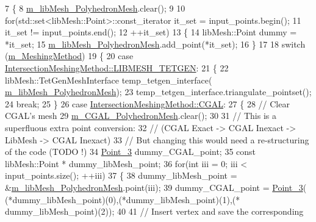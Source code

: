 \begin{DoxyCode}
7 \{
8     \hyperlink{classcarl_1_1_mesh___intersection_a4377fd67cf7c486ba4263fe11b99a3cf}{m\_libMesh\_PolyhedronMesh}.clear();
9 
10     \textcolor{keywordflow}{for}(std::set<libMesh::Point>::const\_iterator it\_set = input\_points.begin();
11             it\_set != input\_points.end();
12             ++it\_set)
13     \{
14         libMesh::Point dummy = *it\_set;
15         \hyperlink{classcarl_1_1_mesh___intersection_a4377fd67cf7c486ba4263fe11b99a3cf}{m\_libMesh\_PolyhedronMesh}.add\_point(*it\_set);
16     \}
17 
18     \textcolor{keywordflow}{switch} (\hyperlink{classcarl_1_1_mesh___intersection_aa42a12f25859de7ce08655a1ada87e50}{m\_MeshingMethod})
19     \{
20     \textcolor{keywordflow}{case} \hyperlink{namespacecarl_a4f72fd25137b97ac1ca1276ec549e5cfa0a91b3dbac7fab7e5efa6f804aab8f58}{IntersectionMeshingMethod::LIBMESH\_TETGEN}:
21     \{
22         libMesh::TetGenMeshInterface            temp\_tetgen\_interface(
      \hyperlink{classcarl_1_1_mesh___intersection_a4377fd67cf7c486ba4263fe11b99a3cf}{m\_libMesh\_PolyhedronMesh});
23         temp\_tetgen\_interface.triangulate\_pointset();
24         \textcolor{keywordflow}{break};
25     \}
26     \textcolor{keywordflow}{case} \hyperlink{namespacecarl_a4f72fd25137b97ac1ca1276ec549e5cfa509162a828acac7eaad1fc369696a3b1}{IntersectionMeshingMethod::CGAL}:
27     \{
28         \textcolor{comment}{// Clear CGAL's mesh}
29         \hyperlink{classcarl_1_1_mesh___intersection_a256506b058cda4c9b767d14277b9650c}{m\_CGAL\_PolyhedronMesh}.clear();
30 
31         \textcolor{comment}{// This is a superfluous extra point conversion:}
32         \textcolor{comment}{// (CGAL Exact -> CGAL Inexact -> LibMesh -> CGAL Inexact)}
33         \textcolor{comment}{// But changing this would need a re-structuring of the code (TODO !)}
34         \hyperlink{_c_g_a_l__typedefs_8h_a9dc49a828e77bbd58c1f5db13edde547}{Point\_3} dummy\_CGAL\_point;
35         \textcolor{keyword}{const} libMesh::Point * dummy\_libMesh\_point;
36         \textcolor{keywordflow}{for}(\textcolor{keywordtype}{int} iii = 0; iii < input\_points.size(); ++iii)
37         \{
38             dummy\_libMesh\_point = &\hyperlink{classcarl_1_1_mesh___intersection_a4377fd67cf7c486ba4263fe11b99a3cf}{m\_libMesh\_PolyhedronMesh}.point(iii);
39             dummy\_CGAL\_point = \hyperlink{_c_g_a_l__typedefs_8h_a9dc49a828e77bbd58c1f5db13edde547}{Point\_3}( (*dummy\_libMesh\_point)(0),(*dummy\_libMesh\_point)(1),(*
      dummy\_libMesh\_point)(2));
40 
41             \textcolor{comment}{// Insert vertex and save the corresponding}

\end{DoxyCode}
